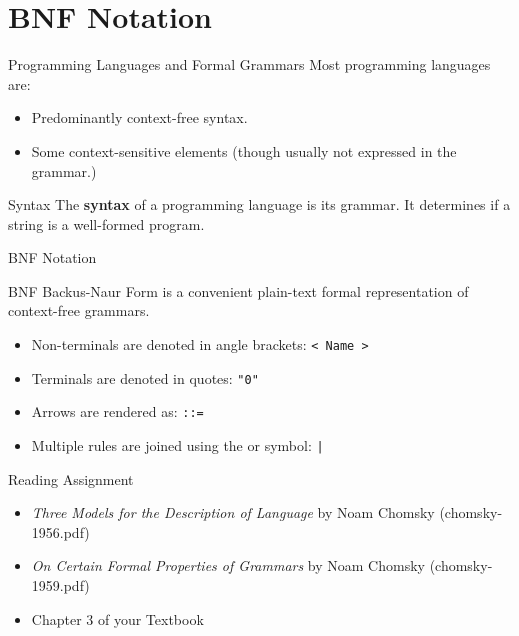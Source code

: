 \documentclass[]{beamer}
\newenvironment{code}{%
 \VerbatimEnvironment
 \begin{adjustbox}{max width=\textwidth, max height=0.7\textheight}
 \begin{BVerbatim}
  }{
  \end{BVerbatim}
 \end{adjustbox}
}
\begin{document}
\section{BNF Notation}

\begin{frame}{Programming Languages and Formal Grammars}
    Most programming languages are:
    \begin{itemize}
        \item Predominantly context-free syntax.
        \item Some context-sensitive elements (though usually not expressed in the grammar.)
    \end{itemize}
    
    \begin{block}{Syntax}
        The {\bf syntax} of a programming language is its grammar. It determines if a string
        is a well-formed program.
    \end{block}
\end{frame}

\begin{frame}{BNF Notation}
    \begin{block}{BNF}
        Backus-Naur Form is a convenient plain-text formal representation of context-free grammars.
    \end{block}
    \begin{itemize}
        \item Non-terminals are denoted in angle brackets: \texttt{< Name >}
        \item Terminals are denoted in quotes: \texttt{"0"}
        \item Arrows are rendered as: \texttt{::=}
        \item Multiple rules are joined using the or symbol: \texttt{|}
    \end{itemize}
\end{frame}



\begin{frame}{Reading Assignment}
    \begin{itemize}
        \item \textit{Three Models for the Description of Language} by Noam Chomsky (chomsky-1956.pdf)
        \item \textit{On Certain Formal Properties of Grammars} by Noam Chomsky (chomsky-1959.pdf)
        \item Chapter 3 of your Textbook
    \end{itemize}
\end{frame}
\end{document}
